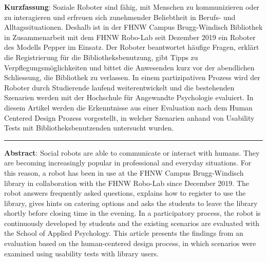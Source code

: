 \textbf{Kurzfassung}: Soziale Roboter sind fähig, mit Menschen zu
kommunizieren oder zu interagieren und erfreuen sich zunehmender
Beliebtheit in Berufs- und Alltagssituationen. Deshalb ist in der FHNW
Campus Brugg-Windisch Bibliothek in Zusammenarbeit mit dem FHNW Robo-Lab
seit Dezember 2019 ein Roboter des Modells Pepper im Einsatz. Der
Roboter beantwortet häufige Fragen, erklärt die Registrierung für die
Bibliotheksbenutzung, gibt Tipps zu Verpflegungsmöglichkeiten und bittet
die Anwesenden kurz vor der abendlichen Schliessung, die Bibliothek zu
verlassen. In einem partizipativen Prozess wird der Roboter durch
Studierende laufend weiterentwickelt und die bestehenden Szenarien
werden mit der Hochschule für Angewandte Psychologie evaluiert. In
diesem Artikel werden die Erkenntnisse aus einer Evaluation nach dem
Human Centered Design Prozess vorgestellt, in welcher Szenarien anhand
von Usability Tests mit Bibliotheksbenutzenden untersucht wurden.

\begin{center}\rule{0.5\linewidth}{0.5pt}\end{center}

\textbf{Abstract}: Social robots are able to communicate or interact
with humans. They are becoming increasingly popular in professional and
everyday situations. For this reason, a robot has been in use at the
FHNW Campus Brugg-Windisch library in collaboration with the FHNW
Robo-Lab since December 2019. The robot answers frequently asked
questions, explains how to register to use the library, gives hints on
catering options and asks the students to leave the library shortly
before closing time in the evening. In a participatory process, the
robot is continuously developed by students and the existing scenarios
are evaluated with the School of Applied Psychology. This article
presents the findings from an evaluation based on the human-centered
design process, in which scenarios were examined using usability tests
with library users.
